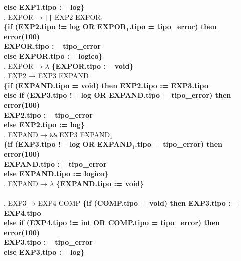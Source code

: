 \begin{tabbing}
    \>                     \> \textbf{else EXP1.tipo := log\}}\\
    . EXPOR → \verb!||! EXP2 EXPOR$_1$\\
    \>                     \>\textbf{\{if (EXP2.tipo != log OR EXPOR$_1$.tipo = tipo\_error) then}\\
    \>                     \> \> \textbf{error(100)}\\
    \>                     \> \> \textbf{EXPOR.tipo := tipo\_error}\\
    \>                     \> \textbf{else EXPOR.tipo := logico\}}\\
    . EXPOR → $\lambda$ \textbf{\{EXPOR.tipo := void\}}\\
    . EXP2 → EXP3 EXPAND\\
    \>                     \>\textbf{\{if (EXPAND.tipo = void) then EXP2.tipo := EXP3.tipo}\\
    \>                     \> \textbf{else if (EXP3.tipo != log OR EXPAND.tipo = tipo\_error) then}\\
    \>                     \> \> \textbf{error(100)}\\
    \>                     \> \> \textbf{EXP2.tipo := tipo\_error}\\
    \>                     \> \textbf{else EXP2.tipo := log\}}\\
    . EXPAND → \verb!&&! EXP3 EXPAND$_1$\\
    \>                     \>\textbf{\{if (EXP3.tipo != log OR EXPAND$_1$.tipo = tipo\_error) then}\\
    \>                     \> \> \textbf{error(100)}\\
    \>                     \> \> \textbf{EXPAND.tipo := tipo\_error}\\
    \>                     \> \textbf{else EXPAND.tipo := logico\}}\\
    . EXPAND → $\lambda$ \textbf{\{EXPAND.tipo := void\}}\\
    \\
    . EXP3 → EXP4 COMP \>\textbf{\{if (COMP.tipo = void) then EXP3.tipo := EXP4.tipo}\\
    \>                     \> \textbf{else if (EXP4.tipo != int OR COMP.tipo = tipo\_error) then}\\
    \>                     \> \> \textbf{error(100)}\\
    \>                     \> \> \textbf{EXP3.tipo := tipo\_error}\\
    \>                     \> \textbf{else EXP3.tipo := log\}}\\

\end{tabbing}
